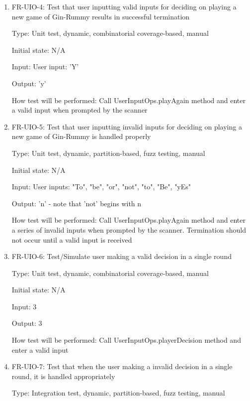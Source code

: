 \documentclass[12pt, titlepage]{article}
\begin{document}
\begin{enumerate}
    \item{FR-UIO-4: Test that user inputting valid inputs for deciding on playing a new game of Gin-Rummy results in successful termination\\}
    
    Type: Unit test, dynamic, combinatorial coverage-based, manual
    
    Initial state: N/A
    
    Input: User input: 'Y'
    
    Output: 'y'
    
    How test will be performed: Call UserInputOps.playAgain method and enter a valid input when prompted by the scanner
    
    \item{FR-UIO-5: Test that user inputting invalid inputs for deciding on playing a new game of Gin-Rummy is handled properly\\}
    
    Type: Unit test, dynamic, partition-based, fuzz testing, manual
    
    Initial state: N/A
    
    Input: User inputs: "To", "be", "or", "not", "to", "Be", "yEs"
    
    Output: 'n' - note that 'not' begins with n
    
    How test will be performed: Call UserInputOps.playAgain method and enter a series of invalid inputs when prompted by the scanner. Termination should not occur until a valid input is received
    
    \item{FR-UIO-6: Test/Simulate user making a valid decision in a single round\\}
    
    Type: Unit test, dynamic, combinatorial coverage-based, manual
    
    Initial state: N/A
    
    Input: 3
    
    Output: 3
    
    How test will be performed: Call UserInputOps.playerDecision method and enter a valid input
    
    \item{FR-UIO-7: Test that when the user making a invalid decision in a single round, it is handled appropriately\\}
    
    Type: Integration test, dynamic, partition-based, fuzz testing, manual
    

\end{enumerate}
\end{document}
